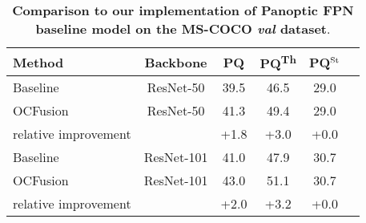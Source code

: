 \documentclass[10pt,twocolumn,letterpaper]{article}
\begin{document}
\begin{table}[!htp]
\vspace{-3mm}
\centering
\setlength{\tabcolsep}{3.0pt}
\begin{tabular}{@{}lccccc@{}}
\hline
\toprule
\textbf{Method} & \textbf{Backbone} & \textbf{PQ} & \textbf{PQ}\textsuperscript{Th} & \textbf{PQ}$\textsuperscript{St}$ \\
\midrule
Baseline & ResNet-50 & 39.5 & 46.5 & 29.0 \\
OCFusion & ResNet-50 & 41.3 & 49.4 & 29.0 \\
\midrule
relative improvement & {} & +1.8 & +3.0 & +0.0 \\
\midrule
Baseline & ResNet-101 & 41.0 & 47.9 & 30.7 \\
OCFusion & ResNet-101 & 43.0 & 51.1 & 30.7 \\
\midrule
relative improvement & {} & +2.0 & +3.2 & +0.0 \\

\bottomrule
\hline
\end{tabular}
\vspace{-2mm}
\caption{\textbf{Comparison to our implementation of Panoptic FPN \cite{kirillov2019panoptic} baseline model on the MS-COCO \textit{val} dataset}.}
\label{table:coco_comp_baseline}
\vspace{-0mm}
\end{table}
\end{document}
